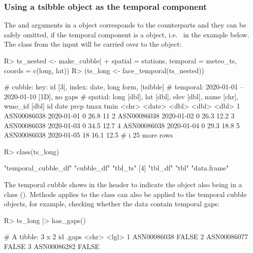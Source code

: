 \documentclass[
  shortnames]{jss}
\begin{document}
\hypertarget{using-a-tsibble-object-as-the-temporal-component}{%
\subsubsection{Using a tsibble object as the temporal component}\label{using-a-tsibble-object-as-the-temporal-component}}

The  and  arguments in a  object corresponds to the  counterparts and they can be safely omitted, if the temporal component is a  object, i.e.~ in the example below. The  class from the input will be carried over to the  object:

\begin{CodeChunk}
\begin{CodeInput}
R> ts_nested <- make_cubble(
+   spatial = stations, temporal = meteo_ts, coords = c(long, lat))
R> (ts_long <- face_temporal(ts_nested))
\end{CodeInput}
\begin{CodeOutput}
# cubble:   key: id [3], index: date, long form, [tsibble]
# temporal: 2020-01-01 -- 2020-01-10 [1D], no gaps
# spatial:  long [dbl], lat [dbl], elev [dbl], name [chr], wmo_id [dbl]
  id          date        prcp  tmax  tmin
  <chr>       <date>     <dbl> <dbl> <dbl>
1 ASN00086038 2020-01-01     0  26.8  11  
2 ASN00086038 2020-01-02     0  26.3  12.2
3 ASN00086038 2020-01-03     0  34.5  12.7
4 ASN00086038 2020-01-04     0  29.3  18.8
5 ASN00086038 2020-01-05    18  16.1  12.5
# i 25 more rows
\end{CodeOutput}
\begin{CodeInput}
R> class(ts_long)
\end{CodeInput}
\begin{CodeOutput}
[1] "temporal_cubble_df" "cubble_df"          "tbl_ts"            
[4] "tbl_df"             "tbl"                "data.frame"        
\end{CodeOutput}
\end{CodeChunk}

The temporal cubble shows \code{[tsibble]} in the header to indicate the object also being in a  class (). Methods applies to the  class can also be applied to the temporal cubble objects, for example, checking whether the data contain temporal gaps:

\begin{CodeChunk}
\begin{CodeInput}
R> ts_long |> has_gaps()
\end{CodeInput}
\begin{CodeOutput}
# A tibble: 3 x 2
  id          .gaps
  <chr>       <lgl>
1 ASN00086038 FALSE
2 ASN00086077 FALSE
3 ASN00086282 FALSE
\end{CodeOutput}
\end{CodeChunk}
\end{document}
